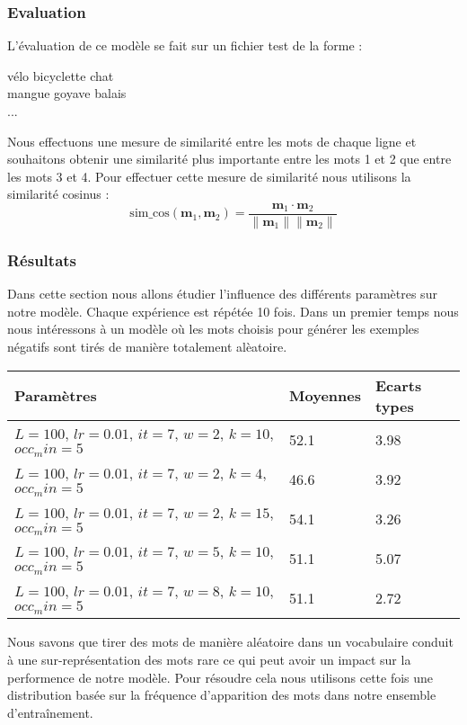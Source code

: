 \documentclass[12pt]{article}
\begin{document}
\subsubsection{Evaluation}
L'évaluation de ce modèle se fait sur un fichier test de la forme :
\begin{center}
vélo bicyclette chat\\
mangue goyave balais\\
...\\
\end{center}
Nous effectuons une mesure de similarité entre les mots de chaque ligne et souhaitons obtenir
une similarité plus importante entre les mots 1 et 2 que entre les mots 3 et 4. Pour effectuer cette mesure de 
similarité nous utilisons la similarité cosinus :
\[
\text{sim\_cos}(\mathbf{m}_1, \mathbf{m}_2) = \frac{\mathbf{m}_1 \cdot \mathbf{m}_2}{\|\mathbf{m}_1\| \|\mathbf{m}_2\|}
\]
\subsubsection{Résultats}
Dans cette section nous allons étudier l'influence des différents paramètres sur notre modèle. 
Chaque expérience est répétée 10 fois. 
Dans un premier temps nous nous intéressons à un modèle où les mots choisis pour générer les exemples négatifs
sont tirés de manière totalement alèatoire.
\newline
\newline
\begin{tabularx}{\textwidth}{|X|X|X|}
    \hline
    Paramètres & Moyennes & Ecarts types \\ 
    \hline
    $L=100$, $lr=0.01$,  $it=7$, $w=2$, $k=10$, $occ_min=5$  & 52.1  & 3.98  \\ 
    \hline
    $L=100$, $lr=0.01$,  $it=7$, $w=2$, $k=4$, $occ_min=5$  & 46.6  & 3.92  \\ 
    \hline
    $L=100$, $lr=0.01$,  $it=7$, $w=2$, $k=15$, $occ_min=5$  & 54.1  & 3.26  \\ 
    \hline
    $L=100$, $lr=0.01$,  $it=7$, $w=5$, $k=10$, $occ_min=5$  & 51.1  & 5.07  \\ 
    \hline
    $L=100$, $lr=0.01$,  $it=7$, $w=8$, $k=10$, $occ_min=5$  & 51.1  &  2.72  \\ 
    \hline
    \end{tabularx}

Nous savons que tirer des mots de manière aléatoire dans un vocabulaire conduit à une sur-représentation des mots rare ce qui peut avoir 
un impact sur la performence de notre modèle. Pour résoudre cela nous utilisons cette fois une distribution basée sur la fréquence d'apparition des 
mots dans notre ensemble d'entraînement. 
\end{document}
